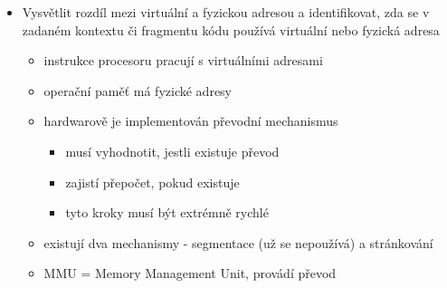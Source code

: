 \begin{itemize}
\begin{itemize}
\begin{itemize}
\begin{itemize}
\end{itemize}
\item longest job first
\end{itemize}
\item preemptivní algoritmy
\begin{itemize}
\item round robin
\begin{itemize}
\item jako FCFS
\item když vlákno trvá moc dlouho, tak se zařadí na konec fronty
\end{itemize}
\item multilevel feedback-queue
\begin{itemize}
\item každá fronta má jinak dlouhý time slice
\item první (horní) ho má kratší, ty pod ní ho mají delší
\item když vlákno trvá moc dlouho, tak se zařadí na konec nižší fronty
\item když se vlákno brzo zablokuje, tak se zařadí na konec vyšší fronty
\end{itemize}
\item completely fair scheduler (CFS)
\begin{itemize}
\item používá červeno-černý strom
\end{itemize}
\end{itemize}
\end{itemize}
\item Vysvětlit rozdíl mezi virtuální a fyzickou adresou a identifikovat, zda se v zadaném kontextu či fragmentu kódu používá virtuální nebo fyzická adresa
\begin{itemize}
\item instrukce procesoru pracují s virtuálními adresami
\item operační paměť má fyzické adresy
\item hardwarově je implementován převodní mechanismus
\begin{itemize}
\item musí vyhodnotit, jestli existuje převod
\item zajistí přepočet, pokud existuje
\item tyto kroky musí být extrémně rychlé
\end{itemize}
\item existují dva mechanismy - segmentace (už se nepoužívá) a stránkování
\item MMU = Memory Management Unit, provádí převod

\end{itemize}
\end{itemize}
